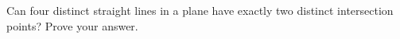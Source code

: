 Can four distinct straight lines in a plane have exactly two distinct intersection points? Prove your answer.
